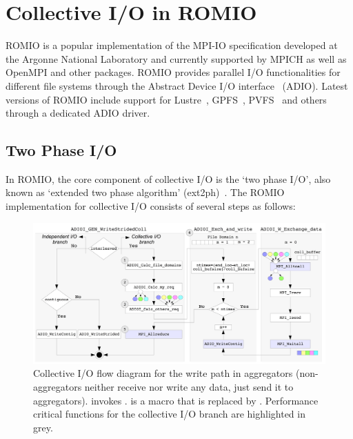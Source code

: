 \section{Collective I/O in ROMIO}
\label{sec: collio}
ROMIO is a popular implementation of the MPI-IO specification developed at the Argonne National Laboratory and currently supported by MPICH as well as OpenMPI and other packages. ROMIO provides parallel I/O functionalities for different file systems through the Abstract Device I/O interface~\cite{ThakurGL96} (ADIO). Latest versions of ROMIO include support for Lustre~\cite{Ying08}, GPFS~\cite{ProstTHKW00}, PVFS~\cite{CarnsLRT} and others through a dedicated ADIO driver.

\subsection{Two Phase I/O}
\label{sec: ext2ph}
In ROMIO, the core component of collective I/O is the `two phase I/O', also known as `extended two phase algorithm' (ext2ph)~\cite{ThakurC96}. The ROMIO implementation for collective I/O consists of several steps as follows:
\begin{figure}[!htb]
  \centering
  \includegraphics[width=\textwidth]{chapters/chapter3/figures/ext2ph}
  \caption{Collective I/O flow diagram for the write path in aggregators (non-aggregators neither receive nor write any data, just send it to aggregators).  invokes .  is a macro that is replaced by . Performance critical functions for the collective I/O branch are highlighted in grey.}
  \label{figure: coll_io_impl}
\end{figure}

